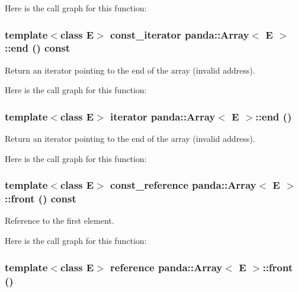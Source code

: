Here is the call graph for this function:\hypertarget{classpanda_1_1Array_a677cb1961e6ed9c941e790663eb5fd48}{
\subsubsection[{end}]{\setlength{\rightskip}{0pt plus 5cm}template$<$class E$>$ {\bf const\_\-iterator} {\bf panda::Array}$<$ E $>$::end () const}}
\label{classpanda_1_1Array_a677cb1961e6ed9c941e790663eb5fd48}


Return an iterator pointing to the end of the array (invalid address). 

Here is the call graph for this function:\hypertarget{classpanda_1_1Array_a278c908fe61e762996552c696b92b04b}{
\subsubsection[{end}]{\setlength{\rightskip}{0pt plus 5cm}template$<$class E$>$ {\bf iterator} {\bf panda::Array}$<$ E $>$::end ()}}
\label{classpanda_1_1Array_a278c908fe61e762996552c696b92b04b}


Return an iterator pointing to the end of the array (invalid address). 

Here is the call graph for this function:\hypertarget{classpanda_1_1Array_a1d8403dec0e8b63a66dabe2050055326}{
\subsubsection[{front}]{\setlength{\rightskip}{0pt plus 5cm}template$<$class E$>$ {\bf const\_\-reference} {\bf panda::Array}$<$ E $>$::front () const}}
\label{classpanda_1_1Array_a1d8403dec0e8b63a66dabe2050055326}


Reference to the first element. 

Here is the call graph for this function:\hypertarget{classpanda_1_1Array_a6146a7f7ea2dc73aed0da04c6b903bf0}{
\subsubsection[{front}]{\setlength{\rightskip}{0pt plus 5cm}template$<$class E$>$ {\bf reference} {\bf panda::Array}$<$ E $>$::front ()}}
\label{classpanda_1_1Array_a6146a7f7ea2dc73aed0da04c6b903bf0}


